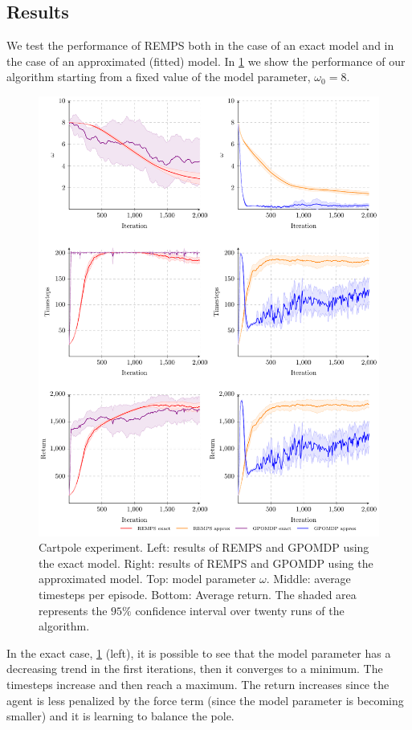 \subsection{Results}
We test the performance of REMPS both in the case of an exact model and in the case of an approximated (fitted) model. 
In \cref{fig:cartpole-exp} we show the performance of our algorithm starting from a fixed value of the model parameter, $\omega_0=8$.
\begin{figure}[tb]
\centering
\includegraphics[width = \textwidth]{plots/cartpole/plot_cartpole_experiment}
\caption{Cartpole experiment. Left: results of REMPS and GPOMDP using the exact model. Right: results of REMPS and GPOMDP using the approximated model. Top: model parameter $\omega$. Middle: average timesteps per episode. Bottom: Average return. The shaded area represents the $95\%$ confidence interval over twenty runs of the algorithm.}
\label{fig:cartpole-exp}
\end{figure}
In the exact case, \cref{fig:cartpole-exp} (left), it is possible to see that the model parameter has a decreasing trend in the first iterations, then it converges to a minimum. The timesteps increase and then reach a maximum. The return increases since the agent is less penalized by the force term (since the model parameter is becoming smaller) and it is learning to balance the pole.
